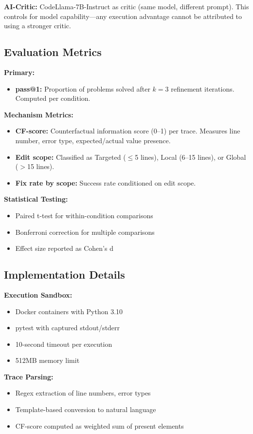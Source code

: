 \textbf{AI-Critic:} CodeLlama-7B-Instruct as critic (same model, different prompt). This controls for model capability---any execution advantage cannot be attributed to using a stronger critic.

\subsection{Evaluation Metrics}

\textbf{Primary:}
\begin{itemize}
\item \textbf{pass@1:} Proportion of problems solved after $k=3$ refinement iterations. Computed per condition.
\end{itemize}

\textbf{Mechanism Metrics:}
\begin{itemize}
\item \textbf{CF-score:} Counterfactual information score (0--1) per trace. Measures line number, error type, expected/actual value presence.
\item \textbf{Edit scope:} Classified as Targeted ($\leq$5 lines), Local (6--15 lines), or Global ($>$15 lines).
\item \textbf{Fix rate by scope:} Success rate conditioned on edit scope.
\end{itemize}

\textbf{Statistical Testing:}
\begin{itemize}
\item Paired t-test for within-condition comparisons
\item Bonferroni correction for multiple comparisons
\item Effect size reported as Cohen's d
\end{itemize}

\subsection{Implementation Details}

\textbf{Execution Sandbox:}
\begin{itemize}
\item Docker containers with Python 3.10
\item pytest with captured stdout/stderr
\item 10-second timeout per execution
\item 512MB memory limit
\end{itemize}

\textbf{Trace Parsing:}
\begin{itemize}
\item Regex extraction of line numbers, error types
\item Template-based conversion to natural language
\item CF-score computed as weighted sum of present elements
\end{itemize}

